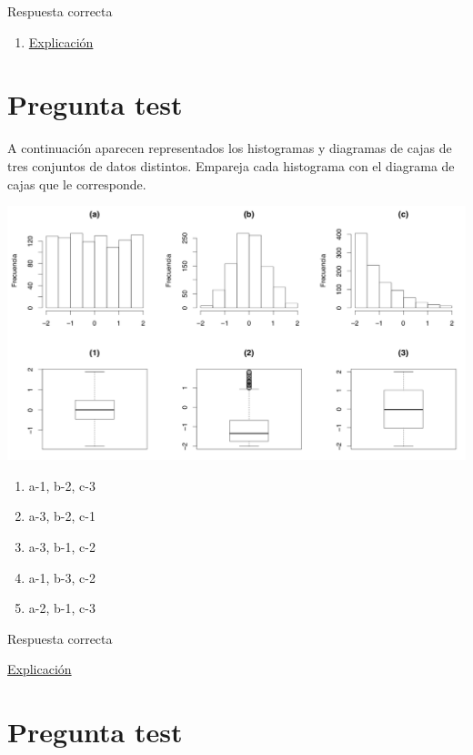 \documentclass[
]{book}
\providecommand{\tightlist}{%
  \setlength{\itemsep}{0pt}\setlength{\parskip}{0pt}}
\begin{document}
Respuesta correcta

\begin{enumerate}
\def\labelenumi{\alph{enumi})}
\setcounter{enumi}{3}
\tightlist
\item
  \href{https://1fjmanzano.github.io/bioestadistica/diagramas-de-barras-y-sectores.html}{Explicación}
\end{enumerate}

\hypertarget{pregunta-test-57}{%
\section{Pregunta test}\label{pregunta-test-57}}

A continuación aparecen representados los histogramas y diagramas de cajas de tres conjuntos de datos distintos. Empareja cada histograma con el diagrama de cajas que le corresponde.

\includegraphics[width=22in]{img/2_8}

\begin{enumerate}
\def\labelenumi{\alph{enumi})}
\tightlist
\item
  a-1, b-2, c-3
\item
  a-3, b-2, c-1
\item
  a-3, b-1, c-2
\item
  a-1, b-3, c-2
\item
  a-2, b-1, c-3
\end{enumerate}

Respuesta correcta

\href{https://1fjmanzano.github.io/bioestadistica/histogramas.html}{Explicación}

\hypertarget{pregunta-test-58}{%
\section{Pregunta test}\label{pregunta-test-58}}
\end{document}
